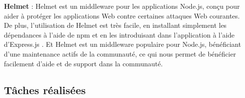 \documentclass[12pt]{article}
\begin{document}
\begin{itemize}
                  \textbf{Helmet} \cite{helmet} : Helmet est
                  un middleware pour les applications Node.js, conçu pour aider à
                  protéger les applications Web contre certaines attaques Web courantes.
                  De plus, l'utilisation de Helmet est très facile, en installant
                  simplement les dépendances à l'aide de npm et en les introduisant dans
                  l'application à l'aide d'Express.js
                  \cite{Express_js}. Et Helmet est un
                  middleware populaire pour Node.js, bénéficiant d'une maintenance
                  actifs de la communauté, ce qui nous permet de bénéficier facilement
                  d'aide et de support dans la communauté.
      \end{itemize}

      \hypertarget{tuxe2ches-ruxe9alisuxe9es}{%
            \subsection{Tâches réalisées}\label{tuxe2ches-ruxe9alisuxe9es}}
\end{document}
